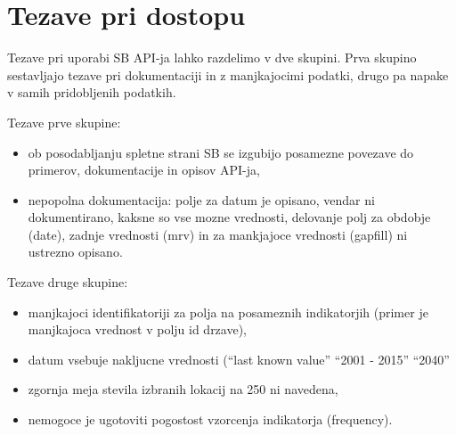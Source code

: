 \section{Tezave pri dostopu}


Tezave pri uporabi SB API-ja lahko razdelimo v dve skupini. Prva skupino
sestavljajo tezave pri dokumentaciji in z manjkajocimi podatki, drugo pa
napake v samih pridobljenih podatkih.

Tezave prve skupine:

\begin{itemize}  
\item ob posodabljanju spletne strani SB se izgubijo posamezne povezave do 
  primerov, dokumentacije in opisov API-ja,
\item nepopolna dokumentacija:
\subitem polje za datum je opisano, vendar ni dokumentirano, kaksne so vse mozne 
    vrednosti,
\subitem delovanje polj za obdobje (date), zadnje vrednosti (mrv) in za mankjajoce
    vrednosti (gapfill) ni ustrezno opisano.
\end{itemize}  

Tezave druge skupine:


\begin{itemize}  
\item manjkajoci identifikatoriji za polja na posameznih indikatorjih (primer je
  manjkajoca vrednost v polju id drzave),
\item datum vsebuje nakljucne vrednosti (``last known value'' ``2001 - 2015'' ``2040''
\item zgornja meja stevila izbranih lokacij na 250 ni navedena,
\item nemogoce je ugotoviti pogostost vzorcenja indikatorja (frequency).
\end{itemize}  








